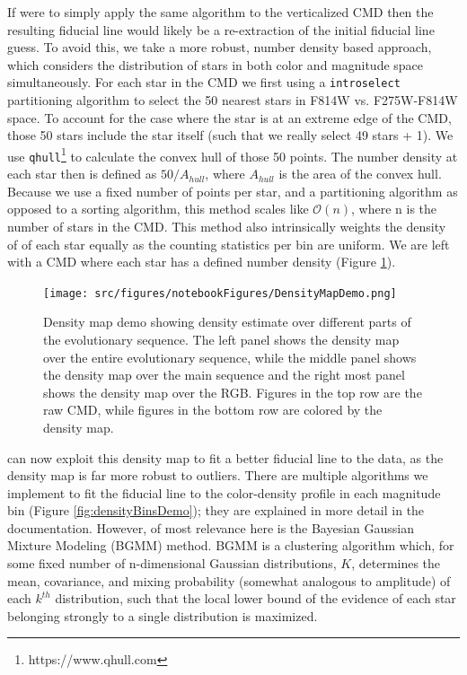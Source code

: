 If \fidanka were to simply apply the same algorithm to the verticalized CMD
then the resulting fiducial line would likely be a re-extraction of the initial
fiducial line guess. To avoid this, we take a more robust, number density based
approach, which considers the distribution of stars in both color and magnitude
space simultaneously. For each star in the CMD we first using a
\texttt{introselect} partitioning algorithm to select the 50 nearest stars in F814W vs. F275W-F814W space.
To account for the case where the star is at an extreme edge of the CMD, those
50 stars include the star itself (such that we really select 49 stars + 1). We
use \texttt{qhull}\footnote{https://www.qhull.com}\citep{Barber1996, } to
calculate the convex hull of those 50 points. The number density at each star
then is defined as $50/A_{hull}$, where $A_{hull}$ is the area of the convex
hull. Because we use a fixed number of points per star, and a partitioning
algorithm as opposed to a sorting algorithm, this method scales like
$\mathcal{O}(n)$, where n is the number of stars in the CMD. This method also
intrinsically weights the density of of each star equally as the counting
statistics per bin are uniform. We are left with a CMD where each star
has a defined number density (Figure \ref{fig:densityMapDemo}).

\begin{figure}
	\centering
	\texttt{[image: src/figures/notebookFigures/DensityMapDemo.png]}
	\label{fig:densityMapDemo}
	\caption{Density map demo showing density estimate over different parts of
	the evolutionary sequence. The left panel shows the density map over the
	entire evolutionary sequence, while the middle panel shows the density map
	over the main sequence and the right most panel shows the density map over
	the RGB. Figures in the top row are the raw CMD, while figures in the
	bottom row are colored by the density map.}
\end{figure}

\fidanka can now exploit this density map to fit a better fiducial line to the
data, as the density map is far more robust to outliers. There are multiple
algorithms we implement to fit the fiducial line to the color-density profile
in each magnitude bin (Figure \ref{fig:densityBinsDemo}); they are explained in more detail in the \fidanka
documentation. However, of most relevance here is the Bayesian Gaussian Mixture
Modeling (BGMM) method. BGMM is a clustering algorithm which, for some fixed
number of n-dimensional Gaussian distributions, $K$, determines the mean, covariance, and
mixing probability (somewhat analogous to amplitude) of each $k^{th}$
distribution, such that the local lower bound of the evidence of each star
belonging strongly to a single distribution is maximized. 

